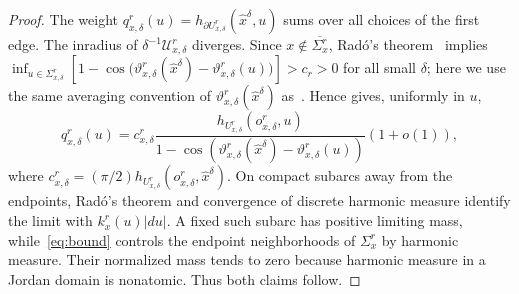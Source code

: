 \documentclass[11pt]{article}
\numberwithin{equation}{section}
\newcommand{\1}{\mathbf{1}}
\begin{document}
\begin{proof}
The weight \(q_{x,\delta}^r(u)=
h_{\partial U_{x,\delta}^r}(\widehat x^\delta,u)\) sums over all
choices of the first edge. The inradius of
\(\delta^{-1}\mathscr U_{x,\delta}^r\) diverges. Since
\(x\notin\overline{\Sigma_x^r}\), Radó's theorem~\cite{Rad23} implies $\inf_{u\in\Sigma_{x,\delta}^r}
 \left[1-\cos\bigl(
 \vartheta_{x,\delta}^r(\widehat x^\delta)
 -\vartheta_{x,\delta}^r(u)\bigr)\right]>c_r>0$
for all small \(\delta\); here we use the same averaging convention of $\vartheta_{x,\delta}^r(\widehat x^\delta)$ as~\cite[above Equation~(21)]{KozdronLawler2005}.
Hence \cite[Theorem~1.1]{KozdronLawler2005} gives, uniformly in \(u\),
\begin{equation}\label{eq:bound}
 q_{x,\delta}^r(u)=c_{x,\delta}^r
  \frac{h_{U_{x,\delta}^r}(o_{x,\delta}^r,u)}
  {1-\cos(\vartheta_{x,\delta}^r(\widehat x^\delta)
                    -\vartheta_{x,\delta}^r(u))}(1+o(1)),
\end{equation}
where \(c_{x,\delta}^r=(\pi/2)
h_{U_{x,\delta}^r}(o_{x,\delta}^r,\widehat x^\delta)\).
On compact subarcs away from the endpoints, Radó's theorem and
convergence of discrete harmonic measure
\cite[Proposition~7.7.2]{LawlerLimic2010} identify the limit with
\(k_x^r(u)|du|\). A fixed such subarc has positive limiting mass,
while~\eqref{eq:bound} controls the endpoint
neighborhoods of $\Sigma_x^r$ by harmonic measure. Their normalized mass tends to
zero because harmonic measure in a Jordan domain is nonatomic.
Thus both claims follow.
\end{proof}
\end{document}
